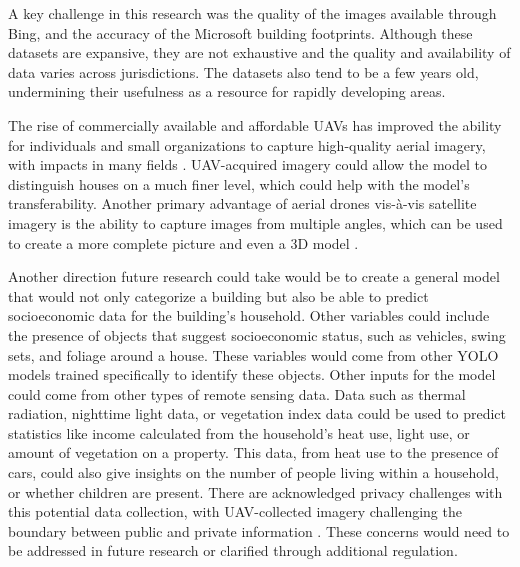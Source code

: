 \documentclass[conference,]{IEEEtran}
\begin{document}
A key challenge in this research was the quality of the images available
through Bing, and the accuracy of the Microsoft building footprints.
Although these datasets are expansive, they are not exhaustive and the
quality and availability of data varies across jurisdictions. The
datasets also tend to be a few years old, undermining their usefulness
as a resource for rapidly developing areas.

The rise of commercially available and affordable UAVs has improved the
ability for individuals and small organizations to capture high-quality
aerial imagery, with impacts in many fields
\autocite{colomina_unmanned_2014,watts_unmanned_2012}. UAV-acquired
imagery could allow the model to distinguish houses on a much finer
level, which could help with the model's transferability. Another
primary advantage of aerial drones vis-à-vis satellite imagery is the
ability to capture images from multiple angles, which can be used to
create a more complete picture and even a 3D model
\autocite{berrettLargeScaleRealityModeling2021}.

Another direction future research could take would be to create a
general model that would not only categorize a building but also be able
to predict socioeconomic data for the building's household. Other
variables could include the presence of objects that suggest
socioeconomic status, such as vehicles, swing sets, and foliage around a
house. These variables would come from other YOLO models trained
specifically to identify these objects. Other inputs for the model could
come from other types of remote sensing data. Data such as thermal
radiation, nighttime light data, or vegetation index data could be used
to predict statistics like income calculated from the household's heat
use, light use, or amount of vegetation on a property. This data, from
heat use to the presence of cars, could also give insights on the number
of people living within a household, or whether children are present.
There are acknowledged privacy challenges with this potential data
collection, with UAV-collected imagery challenging the boundary between
public and private information \autocite{hall_use_2021}. These concerns
would need to be addressed in future research or clarified through
additional regulation.

\balance

\printbibliography[title=References]
\end{document}
